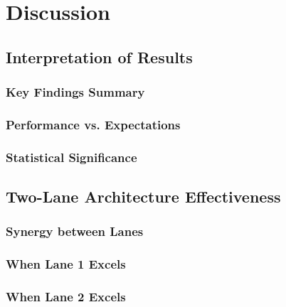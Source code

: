 \chapter{Discussion}
\label{ch:discussion}

%
%
\section{Interpretation of Results}
\label{sec:discussion:interpretation}

\subsection{Key Findings Summary}
\label{subsec:discussion:interpretation:findings}

\subsection{Performance vs. Expectations}
\label{subsec:discussion:interpretation:expectations}

\subsection{Statistical Significance}
\label{subsec:discussion:interpretation:significance}

%
%
\section{Two-Lane Architecture Effectiveness}
\label{sec:discussion:twolane}

\subsection{Synergy between Lanes}
\label{subsec:discussion:twolane:synergy}

\subsection{When Lane 1 Excels}
\label{subsec:discussion:twolane:lane1}

\subsection{When Lane 2 Excels}
\label{subsec:discussion:twolane:lane2}

